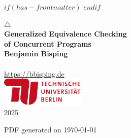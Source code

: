$if(has-frontmatter)$
\frontmatter
$endif$
%
\makeatletter
  \let\ps@plain\ps@empty
\makeatother
\setlength{\headheight}{15pt}
\addtolength{\headwidth}{\marginparwidth}
\fancyhf{}
\fancyhead[LO]{\nouppercase{\rightmark}}
\fancyhead[RO]{\thepage}
\fancyhead[LE]{\thepage}
\fancyhead[RE]{\nouppercase{\leftmark}}
\renewcommand{\headrulewidth}{0pt}
\pagestyle{fancy}
\begin{titlepage}
    \begin{center}
        \vspace{1.5cm}
        {\Large \(\triangle\)}\\[5pt]
        {\huge\bfseries Generalized Equivalence Checking \\ of Concurrent Programs\\}
        \vspace{1.5cm}
        \vfill
        {\Large\bfseries Benjamin Bisping}\\
        \\[5pt]
        \url{https://bbisping.de}\\[14pt]
        \vfill
        \includegraphics[width=0.3\textwidth]{img/tu-berlin-logo-long-red.pdf}\\[5pt]
        \vspace{3cm}
        {2025}\\
        \vspace{1cm}
    \end{center}
\end{titlepage}
\restoregeometry

\newpage
\thispagestyle{empty}
\vfill
{\small PDF generated on \today}

%

\let\mainmatterforreal=\mainmatter
\renewcommand{\mainmatter}{}